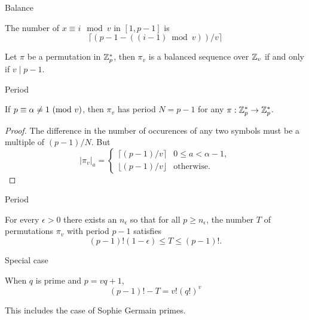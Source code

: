 
    \begin{frame}{Balance}

      The number of $x \equiv i \mod v$ in $[1,p-1]$ is
      \[ \lceil (p-1 - ((i-1) \bmod v))/v\rceil\]

\begin{proposition} \label{balancedproperty}
Let $\pi$ be a permutation in $\mathbb{Z}_p^*$, then $\pi_v$ is a balanced 
sequence over $\mathbb{Z}_v$ if and only if $v \mid p-1$.
\end{proposition}
      
      \end{frame}


      \begin{frame}{Period}

        \begin{lemma} \label{lemma_near_balanced_period}
If $p \equiv \alpha \neq 1 \ (\mathrm{mod}\ v)$, then $\pi_v$ has period $N =p-1$ for any $\pi: \mathbb{Z}_p^* \rightarrow \mathbb{Z}_p^*$.
\end{lemma}
\begin{proof}

  The difference in the number of occurences of any two symbols must be a multiple of $(p-1)/N$. But   
  \[
    |\pi_v|_a = \begin{cases} \lceil (p-1)/v \rceil &  0 \leq a < \alpha -1, \\
      \lfloor (p-1)/v \rfloor & \mbox{otherwise}.
    \end{cases}
  \]
\end{proof}

\end{frame}

\begin{frame}{Period}


\begin{theorem}For every $\epsilon >0 $ there exists an $n_{\epsilon}$ so that for 
  all $p \geq n_{\epsilon}$, the number $T$ of permutations $\pi_v$ with period 
  $p-1$ satisfies 
  \begin{equation} \label{T_bound_epsilon}
    (p-1)!(1-\epsilon) \leq T \leq (p-1)!.
  \end{equation}
\end{theorem}
  
\end{frame}


\begin{frame}{Special case}

  When $q$ is prime and $p=vq+1$,
  \[
    (p-1)! - T = v!(q!)^v 
    \]

    This includes the case of Sophie Germain primes.
  
  \end{frame}

